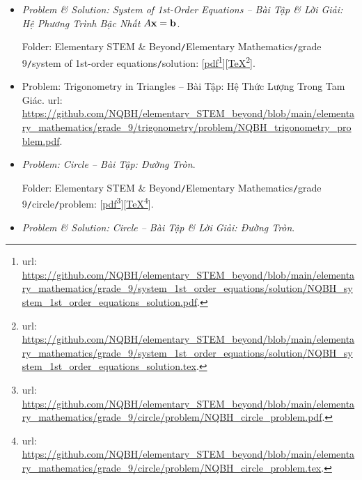 \documentclass[12pt]{article}
\begin{document}
\begin{itemize}
	Folder: {\sf Elementary STEM \& Beyond{\tt/}Elementary Mathematics{\tt/}grade 9{\tt/}system of 1st-order equations{\tt/}problem}: [\href{https://github.com/NQBH/elementary_STEM_beyond/blob/main/elementary_mathematics/grade_9/system_1st_order_equations/problem/NQBH_system_1st_order_equations_problem.pdf}{pdf}\footnote{{\sc url}: \url{https://github.com/NQBH/elementary_STEM_beyond/blob/main/elementary_mathematics/grade_9/system_1st_order_equations/problem/NQBH_system_1st_order_equations_problem.pdf}.}][\href{https://github.com/NQBH/elementary_STEM_beyond/blob/main/elementary_mathematics/grade_9/system_1st_order_equations/problem/NQBH_system_1st_order_equations_problem.tex}{\TeX}\footnote{{\sc url}: \url{https://github.com/NQBH/elementary_STEM_beyond/blob/main/elementary_mathematics/grade_9/system_1st_order_equations/problem/NQBH_system_1st_order_equations_problem.tex}.}].
	\item {\it Problem \& Solution: System of 1st-Order Equations -- Bài Tập \& Lời Giải: Hệ Phương Trình Bậc Nhất $A{\bf x} = {\bf b}$}.
	
	Folder: {\sf Elementary STEM \& Beyond{\tt/}Elementary Mathematics{\tt/}grade 9{\tt/}system of 1st-order equations{\tt/}solution}: [\href{https://github.com/NQBH/elementary_STEM_beyond/blob/main/elementary_mathematics/grade_9/system_1st_order_equations/solution/NQBH_system_1st_order_equations_solution.pdf}{pdf}\footnote{{\sc url}: \url{https://github.com/NQBH/elementary_STEM_beyond/blob/main/elementary_mathematics/grade_9/system_1st_order_equations/solution/NQBH_system_1st_order_equations_solution.pdf}.}][\href{https://github.com/NQBH/elementary_STEM_beyond/blob/main/elementary_mathematics/grade_9/system_1st_order_equations/solution/NQBH_system_1st_order_equations_solution.tex}{\TeX}\footnote{{\sc url}: \url{https://github.com/NQBH/elementary_STEM_beyond/blob/main/elementary_mathematics/grade_9/system_1st_order_equations/solution/NQBH_system_1st_order_equations_solution.tex}.}].
	\item Problem: Trigonometry in Triangles -- Bài Tập: Hệ Thức Lượng Trong Tam Giác. {\sc url}: \url{https://github.com/NQBH/elementary_STEM_beyond/blob/main/elementary_mathematics/grade_9/trigonometry/problem/NQBH_trigonometry_problem.pdf}.	
	\item {\it Problem: Circle -- Bài Tập: Đường Tròn}.
	
	Folder: {\sf Elementary STEM \& Beyond{\tt/}Elementary Mathematics{\tt/}grade 9{\tt/}circle{\tt/}problem}: [\href{https://github.com/NQBH/elementary_STEM_beyond/blob/main/elementary_mathematics/grade_9/circle/problem/NQBH_circle_problem.pdf}{pdf}\footnote{{\sc url}: \url{https://github.com/NQBH/elementary_STEM_beyond/blob/main/elementary_mathematics/grade_9/circle/problem/NQBH_circle_problem.pdf}.}][\href{https://github.com/NQBH/elementary_STEM_beyond/blob/main/elementary_mathematics/grade_9/circle/problem/NQBH_circle_problem.tex}{\TeX}\footnote{{\sc url}: \url{https://github.com/NQBH/elementary_STEM_beyond/blob/main/elementary_mathematics/grade_9/circle/problem/NQBH_circle_problem.tex}.}].
	\item {\it Problem \& Solution: Circle -- Bài Tập \& Lời Giải: Đường Tròn}.
	

\end{itemize}
\end{document}
